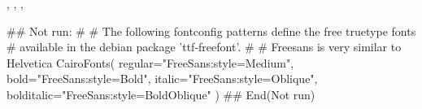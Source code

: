 \begin{SeeAlso}\relax
{},
,
,
\end{SeeAlso}
\begin{Examples}
\begin{ExampleCode}
## Not run: 
#
# The following fontconfig patterns define the free truetype fonts 
# available in the debian package 'ttf-freefont'.
# 
# Freesans is very similar to Helvetica
CairoFonts(
        regular="FreeSans:style=Medium",
        bold="FreeSans:style=Bold",
        italic="FreeSans:style=Oblique",
        bolditalic="FreeSans:style=BoldOblique"
)
## End(Not run)\end{ExampleCode}
\end{Examples}

